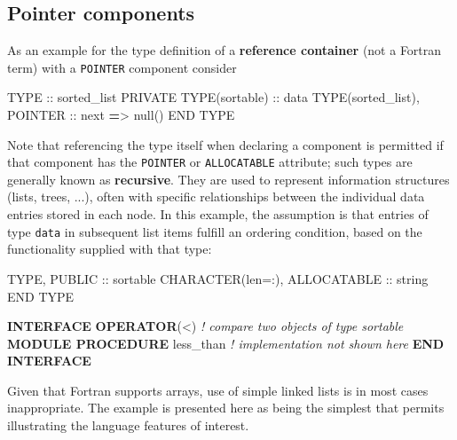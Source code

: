 \documentclass[]{scrartcl}
\newenvironment{Shaded}{}{}
\newcommand{\CommentTok}[1]{\textcolor[rgb]{0.38,0.63,0.69}{\textit{#1}}}
\newcommand{\DataTypeTok}[1]{\textcolor[rgb]{0.56,0.13,0.00}{#1}}
\newcommand{\KeywordTok}[1]{\textcolor[rgb]{0.00,0.44,0.13}{\textbf{#1}}}
\newcommand{\NormalTok}[1]{#1}
\newcommand{\OperatorTok}[1]{\textcolor[rgb]{0.40,0.40,0.40}{#1}}
\begin{document}
\subsection{Pointer components}\label{pointer-components}

As an example for the type definition of a \textbf{reference container}
(not a Fortran term) with a \texttt{POINTER} component consider

\begin{Shaded}
\begin{Highlighting}[]
\DataTypeTok{TYPE} \DataTypeTok{::}\NormalTok{ sorted\_list}
   \DataTypeTok{PRIVATE}
   \DataTypeTok{TYPE(sortable)} \DataTypeTok{::}\NormalTok{ data}
   \DataTypeTok{TYPE(sorted\_list)}\NormalTok{, }\DataTypeTok{POINTER} \DataTypeTok{::}\NormalTok{ next }\KeywordTok{=}\OperatorTok{\textgreater{}}\NormalTok{ null()}
\DataTypeTok{END TYPE}
\end{Highlighting}
\end{Shaded}

Note that referencing the type itself when declaring a component is
permitted if that component has the \texttt{POINTER} or
\texttt{ALLOCATABLE} attribute; such types are generally known as
\textbf{recursive}. They are used to represent information structures
(lists, trees, ...), often with specific relationships between the
individual data entries stored in each node. In this example, the
assumption is that entries of type \texttt{data} in subsequent list
items fulfill an ordering condition, based on the functionality supplied
with that type:

\begin{Shaded}
\begin{Highlighting}[]
\DataTypeTok{TYPE}\NormalTok{, }\DataTypeTok{PUBLIC} \DataTypeTok{::}\NormalTok{ sortable}
   \DataTypeTok{CHARACTER(len=:)}\NormalTok{, }\DataTypeTok{ALLOCATABLE} \DataTypeTok{::}\NormalTok{ string}
\DataTypeTok{END TYPE}

\KeywordTok{INTERFACE} \KeywordTok{OPERATOR}\NormalTok{(}\OperatorTok{\textless{}}\NormalTok{)          }\CommentTok{! compare two objects of type sortable}
   \KeywordTok{MODULE PROCEDURE}\NormalTok{ less\_than  }\CommentTok{! implementation not shown here}
\KeywordTok{END INTERFACE}
\end{Highlighting}
\end{Shaded}

Given that Fortran supports arrays, use of simple linked lists is in
most cases inappropriate. The example is presented here as being the
simplest that permits illustrating the language features of interest.
\end{document}
